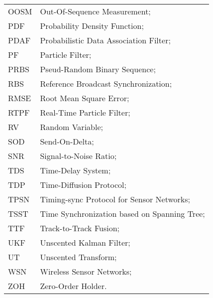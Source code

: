 \begin{longtable}{ll}
	OOSM 		& Out-Of-Sequence Measurement; \\
	PDF         & Probability Density Function; \\
	PDAF		& Probabilistic Data Association Filter; \\
	PF 			& Particle Filter; \\
	PRBS		& Pseud-Random Binary Sequence; \\
	RBS			& Reference Broadcast Synchronization; \\
	RMSE		& Root Mean Square Error; \\
	RTPF		& Real-Time Particle Filter; \\
	RV			& Random Variable; \\
	SOD			& Send-On-Delta; \\
	SNR			& Signal-to-Noise Ratio; \\
	TDS			& Time-Delay System; \\
	TDP			& Time-Diffusion Protocol; \\
	TPSN		& Timing-sync Protocol for Sensor Networks; \\
	TSST		& Time Synchronization based on Spanning Tree; \\
	TTF 		& Track-to-Track Fusion; \\
	UKF			& Unscented Kalman Filter; \\
	UT			& Unscented Transform; \\
	WSN			& Wireless Sensor Networks; \\
	ZOH			& Zero-Order Holder. \\
\end{longtable}

